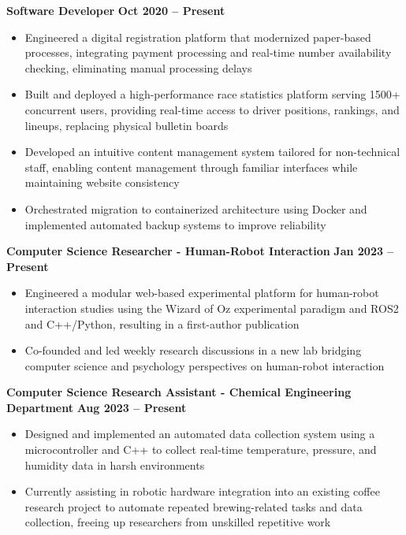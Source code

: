 \documentclass{article}
\begin{document}





 \hfill {}

\textbf{Software Developer} \hfill \textbf{Oct 2020 – Present}
\begin{itemize}[noitemsep,topsep=2pt]
\item Engineered a digital registration platform that modernized paper-based processes, integrating payment processing and real-time number availability checking, eliminating manual processing delays
\item Built and deployed a high-performance race statistics platform serving 1500+ concurrent users, providing real-time access to driver positions, rankings, and lineups, replacing physical bulletin boards
\item Developed an intuitive content management system tailored for non-technical staff, enabling content management through familiar interfaces while maintaining website consistency
\item Orchestrated migration to containerized architecture using Docker and implemented automated backup systems to improve reliability
\end{itemize}

 \hfill {}

\textbf{Computer Science Researcher - Human-Robot Interaction} \hfill \textbf{Jan 2023 – Present}
\begin{itemize}[noitemsep,topsep=2pt]
    \item Engineered a modular web-based experimental platform for human-robot interaction studies using the Wizard of Oz experimental paradigm and ROS2 and C++/Python, resulting in a first-author publication
    \item Co-founded and led weekly research discussions in a new lab bridging computer science and psychology perspectives on human-robot interaction
\end{itemize}

\textbf{Computer Science Research Assistant - Chemical Engineering Department} \hfill \textbf{Aug 2023 – Present}
\begin{itemize}[noitemsep,topsep=2pt]
    \item Designed and implemented an automated data collection system using a microcontroller and C++ to collect real-time temperature, pressure, and humidity data in harsh environments
    \item Currently assisting in robotic hardware integration into an existing coffee research project to automate repeated brewing-related tasks and data collection, freeing up researchers from unskilled repetitive work
\end{itemize}
\end{document}
